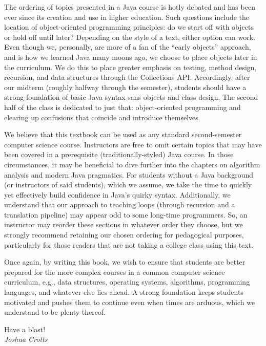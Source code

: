 The ordering of topics presented in a Java course is hotly debated and has been ever since its creation and use in higher education. Such questions include the location of object-oriented programming principles: do we start off with objects or hold off until later? Depending on the style of a text, either option can work. Even though we, personally, are more of a fan of the ``early objects'' approach, and is how we learned Java many moons ago, we choose to place objects later in the curriculum. We do this to place greater emphasis on testing, method design, recursion, and data structures through the Collections API. Accordingly, after our midterm (roughly halfway through the semester), students should have a strong foundation of basic Java syntax sans objects and class design. The second half of the class is dedicated to just that: object-oriented programming and clearing up confusions that coincide and introduce themselves. 

We believe that this textbook can be used as any standard second-semester computer science course. Instructors are free to omit certain topics that may have been covered in a prerequisite (traditionally-styled) Java course. In those circumstances, it may be beneficial to dive further into the chapters on algorithm analysis and modern Java pragmatics. For students without a Java background (or instructors of said students), which we assume, we take the time to quickly yet effectively build confidence in Java's quirky syntax. Additionally, we understand that our approach to teaching loops (through recursion and a translation pipeline) may appear odd to some long-time programmers. So, an instructor may reorder these sections in whatever order they choose, but we strongly recommend retaining our chosen ordering for pedagogical purposes, particularly for those readers that are not taking a college class using this text.

Once again, by writing this book, we wish to ensure that students are better prepared for the more complex courses in a common computer science curriculum, e.g., data structures, operating systems, algorithms, programming languages, and whatever else lies ahead. A strong foundation keeps students motivated and pushes them to continue even when times are arduous, which we understand to be plenty thereof.

\begin{flushright}
Have a blast!\\\emph{Joshua Crotts}
\end{flushright}